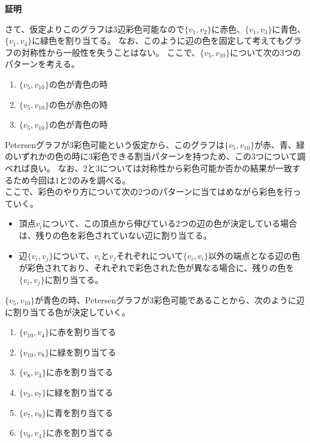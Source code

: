 \documentclass[uplatex,dvipdfmx,a4paper,10pt]{jsarticle}
\makeatletter
\theoremstyle{definition}
\renewenvironment{proof}[1][\proofname]{\par
  \pushQED{\qed}%
  \normalfont \topsep6\p@\@plus6\p@\relax
  \trivlist
  \item\relax
  {\bfseries
  #1\@addpunct{.}}\hspace\labelsep\ignorespaces
}{%
  \popQED\endtrivlist\@endpefalse
}
\makeatother
\begin{document}
\begin{proof}[証明]
\begin{figure}[H]
\end{figure}

さて、仮定よりこのグラフは\(3\)辺彩色可能なので\(\{v_1, v_2\}\)に赤色、\(\{v_1, v_3\}\)に青色、\(\{v_1, v_4\}\)に緑色を割り当てる。
なお、このように辺の色を固定して考えてもグラフの対称性から一般性を失うことはない。
ここで、\(\{v_5, v_{10}\}\)について次の3つのパターンを考える。

\begin{enumerate}
  \item \(\{v_5, v_{10}\}\)の色が青色の時
  \item \(\{v_5, v_{10}\}\)の色が赤色の時
  \item \(\{v_5, v_{10}\}\)の色が青色の時
\end{enumerate}

\noindent Petersenグラフが3彩色可能という仮定から、このグラフは\(\{v_5, v_{10}\}\)が赤、青、緑のいずれかの色の時に3彩色できる割当パターンを持つため、この3つについて調べれば良い。
なお、2と3については対称性から彩色可能か否かの結果が一致するため今回は1と2のみを調べる。 \\

ここで、彩色のやり方について次の2つのパターンに当てはめながら彩色を行っていく。

\begin{itemize}
  \item 頂点\(v_i\)について、この頂点から伸びている2つの辺の色が決定している場合は、残りの色を彩色されていない辺に割り当てる。
  \item 辺\(\{v_i, v_j\}\)について、\(v_i\)と\(v_j\)それぞれについて\(\{v_i, v_i\}\)以外の端点となる辺の色が彩色されており、それぞれで彩色された色が異なる場合に、残りの色を\(\{v_i, v_j\}\)に割り当てる。
\end{itemize}

\(\{v_5, v_{10}\}\)が青色の時、Petersenグラフが3彩色可能であることから、次のように辺に割り当てる色が決定していく。

\begin{enumerate}
  \item \(\{v_{10}, v_4\}\)に赤を割り当てる
  \item \(\{v_{10}, v_8\}\)に緑を割り当てる
  \item \(\{v_8, v_3\}\)に赤を割り当てる
  \item \(\{v_3, v_7\}\)に緑を割り当てる
  \item \(\{v_7, v_9\}\)に青を割り当てる
  \item \(\{v_9, v_4\}\)に赤を割り当てる
\end{enumerate}


\end{proof}
\end{document}
